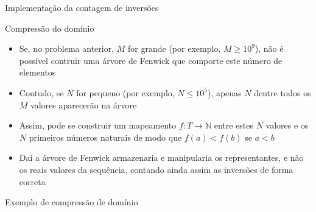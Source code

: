 \begin{frame}[fragile]{Implementação da contagem de inversões}
\end{frame}

\begin{frame}[fragile]{Compressão do domínio}

    \begin{itemize}
        \item Se, no problema anterior, $M$ for grande (por exemplo, $M \geq 10^9$), não é
            possível contruir uma árvore de Fenwick que comporte este número de elementos

        \item Contudo, se $N$ for pequeno (por exemplo, $N \leq 10^5$), apenas $N$ dentre todos
            os $M$ valores aparecerão na árvore

        \item Assim, pode se construir um mapeamento $f : T \to \mathbb{N}$ entre estes $N$ 
            valores e os $N$ primeiros números naturais de modo que $f(a) < f(b)$ se $a < b$

        \item Daí a árvore de Fenwick armazenaria e manipularia os representantes, e não os
            reais valores da sequência, contando ainda assim as inversões de forma correta
    \end{itemize}

\end{frame}

\begin{frame}[fragile]{Exemplo de compressão de domínio}
\end{frame}
